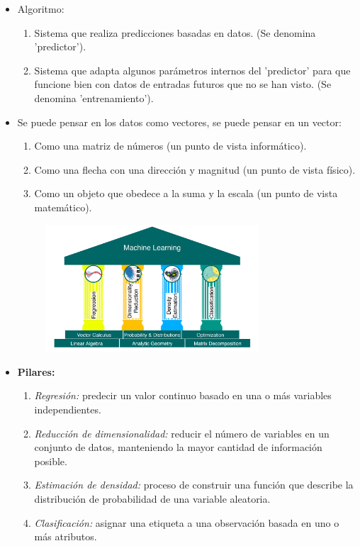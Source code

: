 \documentclass{templateApunte}
\begin{document}
\begin{itemize}
  \item Algoritmo:
  \begin{enumerate}
    \item Sistema que realiza predicciones basadas en datos. (Se denomina 'predictor').
    \item Sistema que adapta algunos parámetros internos del 'predictor' para que funcione bien con datos de entradas futuros que no se han visto. (Se denomina 'entrenamiento').
  \end{enumerate}
  \item Se puede pensar en los datos como vectores, se puede pensar en un vector:
  \begin{enumerate}
    \item Como una matriz de números (un punto de vista informático).
    \item Como una flecha con una dirección y magnitud (un punto de vista físico). 
    \item Como un objeto que obedece a la suma y la escala (un punto de vista matemático).
  \end{enumerate}

  \newpage
  \begin{figure}[H]
    \centering
    \includegraphics[width=0.75\textwidth]{img/pilaresML.png}
  \end{figure}

  \item \textbf{Pilares:}
  \begin{enumerate}
    \item \textit{Regresión:} predecir un valor continuo basado en una o más variables \newline independientes.
    \item \textit{Reducción de dimensionalidad:} reducir el número de variables en un conjunto de datos, manteniendo la mayor cantidad de información posible.
    \item \textit{Estimación de densidad:} proceso de construir una función que describe la distribución de probabilidad de una variable aleatoria.
    \item \textit{Clasificación:} asignar una etiqueta a una observación basada en uno o más atributos.
  \end{enumerate}


\end{itemize}
\end{document}
